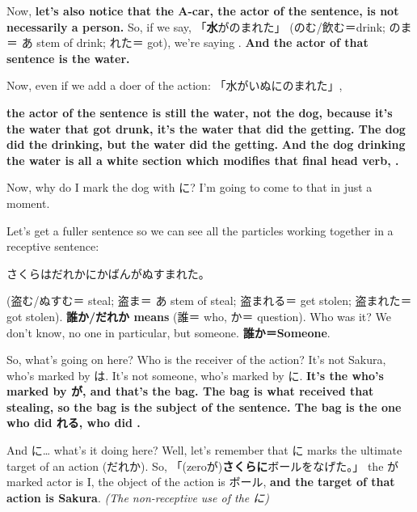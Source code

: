 \thinrule

Now, {\bf let's also notice that the A-car, the actor of the sentence, is not necessarily a person.} So, if we say, 「{\bf 水}がのまれた」 (のむ/飲む＝drink; のま＝ あ stem of drink; れた＝ got), we're saying . {\bf And the actor of that sentence is the water.}

{}

Now, even if we add a doer of the action: 「水がいぬにのまれた」,

{}

{\bf the actor of the sentence is still the water, not the dog, because it's the water that got drunk, it's the water that did the getting. The dog did the drinking, but the water did the getting.} {\bf And the dog drinking the water is all a white section which modifies that final head verb, .} 

Now, why do I mark the dog with に? I'm going to come to that in just a moment.

Let's get a fuller sentence so we can see all the particles working together in a receptive sentence:

\startblockquote
さくらはだれかにかばんがぬすまれた。
\stopblockquote

{}

(盗む/ぬすむ＝ steal; 盗ま＝ あ stem of steal; 盗まれる＝ get stolen; 盗まれた＝ got stolen). {\bf 誰か/だれか means } (誰＝ who, か＝ question). Who was it? We don't know, no one in particular, but someone. {\bf 誰か＝Someone}.

\thinrule

So, what's going on here? Who is the receiver of the action? It's not Sakura, who's marked by は. It's not someone, who's marked by に. {\bf It's the  who's marked by が, and that's the bag. The bag is what received that stealing, so the bag is the subject of the sentence. The bag is the one who did れる, who did .}

{}

And に\ldots{} what's it doing here? Well, let's remember that に marks the ultimate target of an action (だれか). So, 「(zeroが){\bf さくらに}ボールをなげた。」 the が marked actor is I, the object of the action is ボール, {\bf and the target of that action is Sakura}. {\em (The non-receptive use of the に)}

